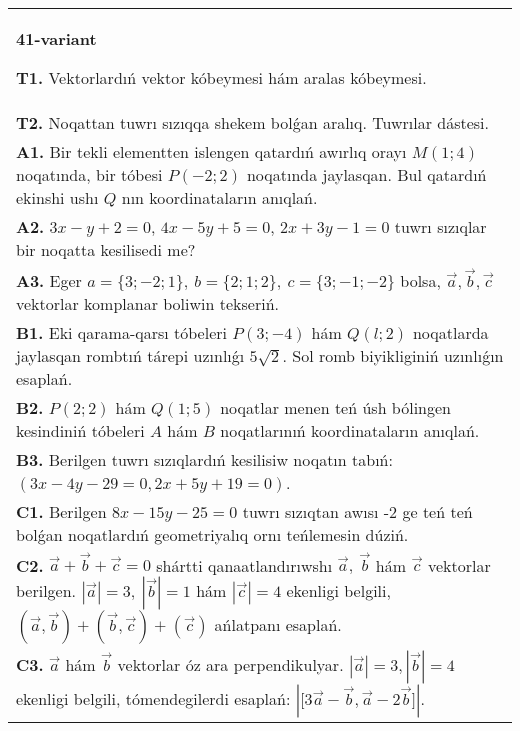 \documentclass{article}
\begin{document}
\begin{tabular}{m{17cm}}
\textbf{41-variant}

\textbf{T1.} 
Vektorlardıń vektor kóbeymesi hám aralas kóbeymesi.
 \\
\textbf{T2.} 
Noqattan tuwrı sızıqqa shekem bolǵan aralıq. Tuwrılar dástesi.
 \\
\textbf{A1.} 
Bir tekli elementten islengen qatardıń awırlıq orayı
$M (1;4) $ noqatında, bir tóbesi $P (-2;2) $ noqatında jaylasqan. Bul
qatardıń ekinshi ushı $Q$ nın koordinataların anıqlań.
 \\
\textbf{A2.} 
$3x-y+2=0$, $4x-5y+5=0$, $2x+3y-1=0$
tuwrı sızıqlar bir noqatta kesilisedi me?
 \\
\textbf{A3.} 
Eger \(a = \{ 3; - 2;1\}, \ b = \{ 2;1;2\}, \ c = \{ 3; - 1; - 2\}\) bolsa, $\overrightarrow{a}, \overrightarrow{b}, \overrightarrow{c}$ vektorlar komplanar boliwin tekseriń.
 \\
\textbf{B1.} 
Eki qarama-qarsı tóbeleri $P (3; -4) $ hám $Q (l;2) $ noqatlarda jaylasqan rombtıń tárepi uzınlıǵı \(5\sqrt{2}\). Sol romb biyikliginiń uzınlıǵın esaplań.
 \\
\textbf{B2.} 
\(P (2;2) \) hám \(Q (1;5) \) noqatlar menen teń úsh
bólingen kesindiniń tóbeleri $A$ hám $B$ noqatlarınıń
koordinataların anıqlań.
 \\
\textbf{B3.} 
Berilgen tuwrı sızıqlardıń kesilisiw noqatın tabıń:
$(3x-4y-29=0, 2x+5y+19=0) $.
 \\
\textbf{C1.} 
Berilgen \(8x-15y-25=0\) tuwrı sızıqtan awısı -2 ge teń
teń bolǵan noqatlardıń geometriyalıq ornı teńlemesin dúziń.
 \\
\textbf{C2.} 
$\vec{a} + \vec{b} + \vec{c} = 0$ shártti qanaatlandırıwshı $\vec{a},\ \vec{b}$ hám $\vec{c}$ vektorlar berilgen. $|\vec{a}| = 3,\ |\vec{b}| = 1$ hám $|\vec{c}| = 4$ ekenligi belgili, $\left(\vec{a},\vec{b} \right) + \left(\vec{b},\vec{c} \right) + (\vec{c}) $ ańlatpanı esaplań.
 \\
\textbf{C3.} 
$\vec{a}$ hám $\vec{b}$ vektorlar óz ara perpendikulyar. $|\vec{a}| = 3,|\vec{b}| = 4$ ekenligi belgili, tómendegilerdi esaplań:
$|\lbrack 3\vec{a} - \vec{b},\vec{a}-2\vec{b}\rbrack|$.
 \\

\end{tabular}
\vspace{1cm}
\end{document}
